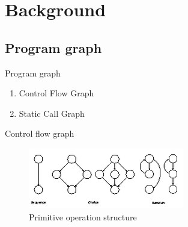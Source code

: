 \documentclass{beamer}
\begin{document}

%
% 

%
\section{Background}
\subsection{Program graph}
\begin{frame}{Program graph}
    \begin{enumerate}
        \item Control Flow Graph
        \item Static Call Graph
    \end{enumerate}
\end{frame}


\begin{frame}{Control flow graph}
    \begin{figure}
        \includegraphics[width=.8\paperwidth]{figure/Primitive-Operation-Structure}
        \caption{Primitive operation structure \parencite{McCabe1976}}
        \label{fig:primitivestructure}
    \end{figure}
\end{frame}
\end{document}
